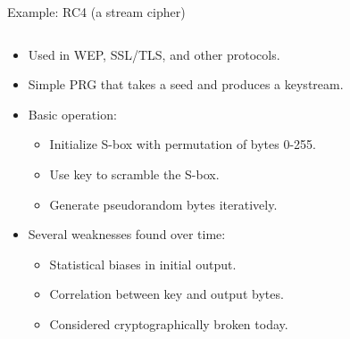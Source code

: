 \documentclass[aspectratio=169, lualatex, handout]{beamer}
\begin{document}
\begin{frame}{Example: RC4 (a stream cipher)}
	\begin{columns}[c]
		\begin{column}{0.6\textwidth}
			\begin{itemize}[<+->]
				\item Used in WEP, SSL/TLS, and other protocols.
				\item Simple PRG that takes a seed and produces a keystream.
				\item Basic operation:
				      \begin{itemize}[<+->]
					      \item Initialize S-box with permutation of bytes 0-255.
					      \item Use key to scramble the S-box.
					      \item Generate pseudorandom bytes iteratively.
				      \end{itemize}
				\item Several weaknesses found over time:
				      \begin{itemize}[<+->]
					      \item Statistical biases in initial output.
					      \item Correlation between key and output bytes.
					      \item Considered cryptographically broken today.
				      \end{itemize}
			\end{itemize}
		\end{column}
		\begin{column}{0.4\textwidth}
			\vspace{1em}
		\end{column}
	\end{columns}
\end{frame}
\end{document}
